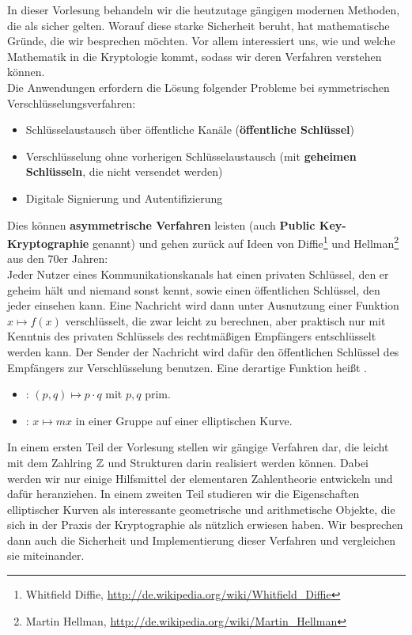 In dieser Vorlesung behandeln wir die heutzutage gängigen modernen Methoden, die als sicher gelten. 
Worauf diese starke Sicherheit beruht, hat mathematische Gründe, die wir besprechen möchten. 
Vor allem interessiert uns, wie und welche Mathematik in die Kryptologie kommt, sodass wir deren Verfahren verstehen können. \\

Die Anwendungen erfordern die Lösung folgender Probleme bei symmetrischen Verschlüsselungsverfahren:
\begin{itemize}
	\item Schlüsselaustausch über öffentliche Kanäle (\textbf{öffentliche Schlüssel})
	\item Verschlüsselung ohne vorherigen Schlüsselaustausch (mit \textbf{geheimen Schlüsseln}, die nicht versendet werden)
	\item Digitale Signierung und Autentifizierung
\end{itemize}
Dies können \textbf{asymmetrische Verfahren} leisten (auch \textbf{Public Key-Kryptographie} genannt) und gehen zurück auf Ideen von Diffie\footnote{Whitfield Diffie, \url{http://de.wikipedia.org/wiki/Whitfield_Diffie}} und Hellman\footnote{Martin Hellman, \url{http://de.wikipedia.org/wiki/Martin_Hellman}} aus den 70er Jahren: \\

Jeder Nutzer eines Kommunikationskanals hat einen privaten Schlüssel, den er geheim hält und niemand sonst kennt, sowie einen öffentlichen Schlüssel, den jeder einsehen kann. 
Eine Nachricht wird dann unter Ausnutzung einer Funktion $x \mapsto f(x)$ verschlüsselt, die zwar leicht zu berechnen, aber praktisch nur mit Kenntnis des privaten Schlüssels des rechtmäßigen Empfängers entschlüsselt werden kann. 
Der Sender der Nachricht wird dafür den öffentlichen Schlüssel des Empfängers zur Verschlüsselung benutzen. 
Eine derartige Funktion heißt .

\begin{itemize}
	\item {}: $(p,q) \mapsto p \cdot q$ mit $p,q$ prim.
	\item {}: $x \mapsto mx$ in einer Gruppe auf einer elliptischen Kurve.
\end{itemize}

In einem ersten Teil der Vorlesung stellen wir gängige Verfahren dar, die leicht mit dem Zahlring $\mathbb{Z}$ und Strukturen darin realisiert werden können. 
Dabei werden wir nur einige Hilfsmittel der elementaren Zahlentheorie entwickeln und dafür heranziehen. 
In einem zweiten Teil studieren wir die Eigenschaften elliptischer Kurven als interessante geometrische und arithmetische Objekte, die sich in der Praxis der Kryptographie als nützlich erwiesen haben. 
Wir besprechen dann auch die Sicherheit und Implementierung dieser Verfahren und vergleichen sie miteinander.

